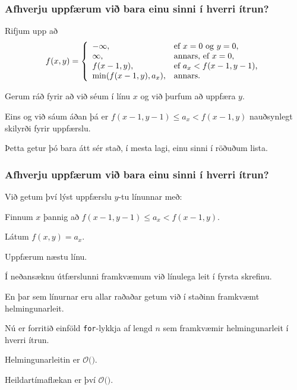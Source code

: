 {
	\frametitle{Afhverju uppfærum við bara einu sinni í hverri ítrun?}
	{
		\item<1-> Rifjum upp að
		\[
			f(x, y) = \left \{
			\env{array}
			{ {l l}
				-\infty, & \text{ef $x = 0$ og $y = 0$,} \\
				\infty, & \text{annars, ef $x = 0$,} \\
				f(x - 1, y), & \text{ef $a_x < f(x - 1, y - 1)$,} \\
				\min(f(x - 1, y), a_x), & \text{annars.}
			}
			\right .
		\]
		\item<2-> Gerum ráð fyrir að við séum í línu $x$ og við þurfum að uppfæra $y$.
		\item<3-> Eins og við sáum áðan þá er $f(x - 1, y - 1) \leq a_x < f(x - 1, y)$ nauðsynlegt skilyrði fyrir uppfærslu.
		\item<4-> Þetta getur þó bara átt sér stað, í mesta lagi, einu sinni í röðuðum lista.
	}
}

{
	\frametitle{Afhverju uppfærum við bara einu sinni í hverri ítrun?}
	{
		\item<1-> Við getum því lýst uppfærslu $y$-tu línunnar með:
		{
			\item<2-> Finnum $x$ þannig að $f(x - 1, y - 1) \leq a_x < f(x - 1, y)$.
			\item<3-> Látum $f(x, y) = a_x$.
			\item<4-> Uppfærum næstu línu.
		}
		\item<5-> Í neðansæknu útfærslunni framkvæmum við línulega leit í fyrsta skrefinu.
		\item<6-> En þar sem línurnar eru allar raðaðar getum við í staðinn framkvæmt helmingunarleit.
	}
}

{
}

{
	{
		\item<1-> Nú er forritið einföld \texttt{for}-lykkja af lengd $n$ sem framkvæmir helmingunarleit í hverri ítrun.
		\item<2-> Helmingunarleitin er $\mathcal{O}($\onslide<3->{$\log n$}$)$.
		\item<4-> Heildartímaflækan er því $\mathcal{O}($\onslide<5->{$n \log n$}$)$.
	}
}

{
}


